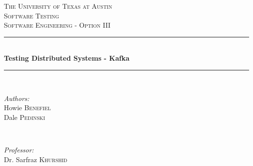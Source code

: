 \begin{titlepage}

\newcommand{\HRule}{\rule{\linewidth}{0.5mm}} %

\center %
 

\textsc{\LARGE The University of Texas at Austin}\\[1.5cm] %
\textsc{\Large Software Testing}\\[0.5cm] %
\textsc{\large Software Engineering - Option III}\\[0.5cm] %


\HRule \\[0.4cm]
{ \huge \bfseries Testing Distributed Systems - Kafka}\\[0.4cm] %
\HRule \\[1.5cm]
 

\begin{minipage}{0.4\textwidth}
\begin{flushleft} \large
\emph{Authors:}\\
Howie \textsc{Benefiel}\\
Dale \textsc{Pedinski} %
\end{flushleft}
\end{minipage}
~
\begin{minipage}{0.4\textwidth}
\begin{flushright} \large
\emph{Professor:} \\
Dr. Sarfraz \textsc{Khurshid} %
\end{flushright}
\end{minipage}\\[2cm]


\end{titlepage}
